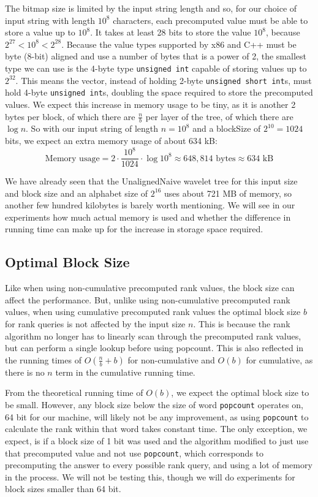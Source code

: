 The bitmap size is limited by the input string length and so, for our choice of input string with length $10^8$ characters, each precomputed value must be able to store a value up to $10^8$.
It takes at least 28 bits to store the value $10^8$, because $2^{27} < 10^8 < 2^{28}$.
Because the value types supported by x86 and C++ must be byte (8-bit) aligned and use a number of bytes that is a power of 2, the smallest type we can use is the 4-byte type \texttt{unsigned int} capable of storing values up to $2^{32}$.
This means the vector, instead of holding 2-byte \texttt{unsigned short int}s, must hold 4-byte \texttt{unsigned int}s, doubling the space required to store the precomputed values.
We expect this increase in memory usage to be tiny, as it is another 2 bytes per block, of which there are $\frac{n}{b}$ per layer of the tree, of which there are $\log n$.
So with our input string of length $n = 10^8$ and a blockSize of $2^{10} = 1024$ bits, we expect an extra memory usage of about 634 kB:
\[\text{Memory usage} = 2 \cdot \frac{10^8}{1024} \cdot \log 10^8 \approx 648,814 \text{ bytes} \approx 634 \text{ kB} \]

We have already seen that the UnalignedNaive wavelet tree for this input size and block size and an alphabet size of $2^{16}$ uses about 721 MB of memory, so another few hundred kilobytes is barely worth mentioning.
We will see in our experiments how much actual memory is used and whether the difference in running time can make up for the increase in storage space required.

\subsection{Optimal Block Size}
\label{sec:OptimalBlockSize}
Like when using non-cumulative precomputed rank values, the block size can affect the performance.
But, unlike using non-cumulative precomputed rank values, when using cumulative precomputed rank values the optimal block size $b$ for rank queries is not affected by the input size $n$.
This is because the rank algorithm no longer has to linearly scan through the precomputed rank values, but can perform a single lookup before using popcount.
This is also reflected in the running times of $O(\frac{n}{b} + b)$ for non-cumulative and $O(b)$ for cumulative, as there is no $n$ term in the cumulative running time.

From the theoretical running time of $O(b)$, we expect the optimal block size to be small.
However, any block size below the size of word \texttt{popcount} operates on, 64 bit for our machine, will likely not be any improvement, as using \texttt{popcount} to calculate the rank within that word takes constant time.
The only exception, we expect, is if a block size of 1 bit was used and the algorithm modified to just use that precomputed value and not use \texttt{popcount}, which corresponds to precomputing the answer to every possible rank query, and using a lot of memory in the process.
We will not be testing this, though we will do experiments for block sizes smaller than 64 bit.


